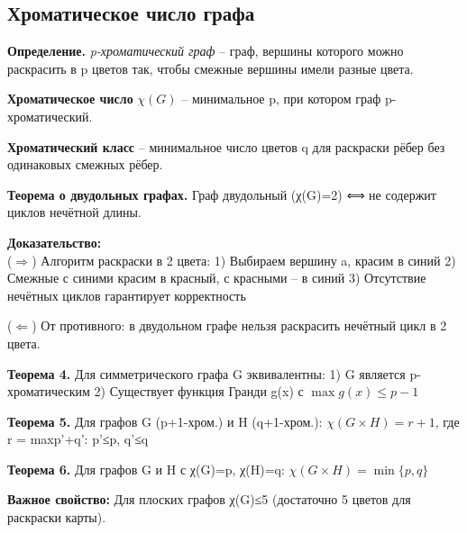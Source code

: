 \subsection{Хроматическое число графа}

\noindent\textbf{Определение.} \textit{p-хроматический граф} -- граф, вершины которого можно раскрасить в p цветов так, чтобы смежные вершины имели разные цвета.

\noindent\textbf{Хроматическое число} $\chi(G)$ -- минимальное p, при котором граф p-хроматический.

\noindent\textbf{Хроматический класс} -- минимальное число цветов q для раскраски рёбер без одинаковых смежных рёбер.

\noindent\textbf{Теорема о двудольных графах.} Граф двудольный (χ(G)=2) ⟺ не содержит циклов нечётной длины.

\noindent\textbf{Доказательство:}\\
($\Rightarrow$) Алгоритм раскраски в 2 цвета:
1) Выбираем вершину a, красим в синий
2) Смежные с синими красим в красный, с красными -- в синий
3) Отсутствие нечётных циклов гарантирует корректность

($\Leftarrow$) От противного: в двудольном графе нельзя раскрасить нечётный цикл в 2 цвета.

\noindent\textbf{Теорема 4.} Для симметрического графа G эквивалентны:
1) G является p-хроматическим
2) Существует функция Гранди g(x) с $\max g(x) \leq p-1$

\noindent\textbf{Теорема 5.} Для графов G (p+1-хром.) и H (q+1-хром.):
$\chi(G \times H) = r+1$, где r = max{p'+q': p'≤p, q'≤q}

\noindent\textbf{Теорема 6.} Для графов G и H с χ(G)=p, χ(H)=q:
$\chi(G \times H) = \min\{p,q\}$

\noindent\textbf{Важное свойство:} Для плоских графов χ(G)≤5 (достаточно 5 цветов для раскраски карты).